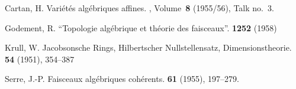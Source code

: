 \documentclass{article}
\theoremstyle{plain}
\theoremstyle{definition}
\begin{document}
\nocite{*}
\begin{thebibliography}{10}

  {\sc Cartan, H.}
  \newblock Vari\'{e}t\'{e}s alg\'{e}briques affines.
  , Volume~\textbf{8} (1955/56), Talk no.~3.

  {\sc Godement, R.}
  \newblock ``Topologie alg\'{e}brique et th\'{e}orie des faisceaux''.
   \textbf{1252} (1958)

  {\sc Krull, W.}
  \newblock Jacobsonsche Rings, Hilbertscher Nullstellensatz, Dimensionstheorie.
   \textbf{54} (1951), 354--387

  {\sc Serre, J.-P.}
  \newblock Faisceaux alg\'{e}briques coh\'{e}rents.
   \textbf{61} (1955), 197--279.

\end{thebibliography}
\end{document}

